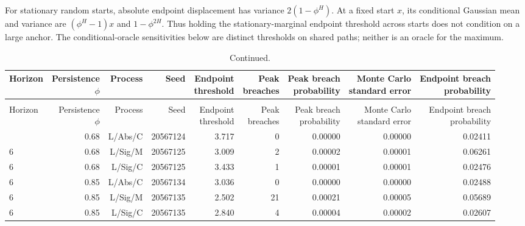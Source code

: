 \documentclass[10pt,a4paper]{article}
\begin{document}
For stationary random starts, absolute endpoint displacement has
variance \(2(1-\phi^H)\). At a fixed start \(x\), its conditional Gaussian
mean and variance are \((\phi^H-1)x\) and \(1-\phi^{2H}\). Thus holding the
stationary-marginal endpoint threshold across starts does not condition on a
large anchor. The conditional-oracle sensitivities below are distinct thresholds
on shared paths; neither is an oracle for the maximum.
\begingroup
\footnotesize
\setlength{\tabcolsep}{3pt}
\renewcommand{\arraystretch}{1.12}
\begin{longtable}{lrrrrrrrr}
\caption{All secondary anchor and conditional-threshold sensitivities. Conditional and marginal endpoint calibration remain distinct.}\\
\toprule
Horizon & \shortstack{Persistence\\\(\phi\)} & Process & Seed & \shortstack{Endpoint\\threshold} & \shortstack{Peak\\breaches} & \shortstack{Peak breach\\probability} & \shortstack{Monte Carlo\\standard error} & \shortstack{Endpoint breach\\probability} \\
\midrule
\endfirsthead
\caption[]{Continued.}\\
\toprule
Horizon & \shortstack{Persistence\\\(\phi\)} & Process & Seed & \shortstack{Endpoint\\threshold} & \shortstack{Peak\\breaches} & \shortstack{Peak breach\\probability} & \shortstack{Monte Carlo\\standard error} & \shortstack{Endpoint breach\\probability} \\
\midrule
\endhead
\bottomrule
\endfoot
6 & 0.68 & L/Abs/C & 20567124 & 3.717 & 0 & 0.00000 & 0.00000 & 0.02411 \\
6 & 0.68 & L/Sig/M & 20567125 & 3.009 & 2 & 0.00002 & 0.00001 & 0.06261 \\
6 & 0.68 & L/Sig/C & 20567125 & 3.433 & 1 & 0.00001 & 0.00001 & 0.02476 \\
6 & 0.85 & L/Abs/C & 20567134 & 3.036 & 0 & 0.00000 & 0.00000 & 0.02488 \\
6 & 0.85 & L/Sig/M & 20567135 & 2.502 & 21 & 0.00021 & 0.00005 & 0.05689 \\
6 & 0.85 & L/Sig/C & 20567135 & 2.840 & 4 & 0.00004 & 0.00002 & 0.02607 \\

\end{longtable}
\end{document}

